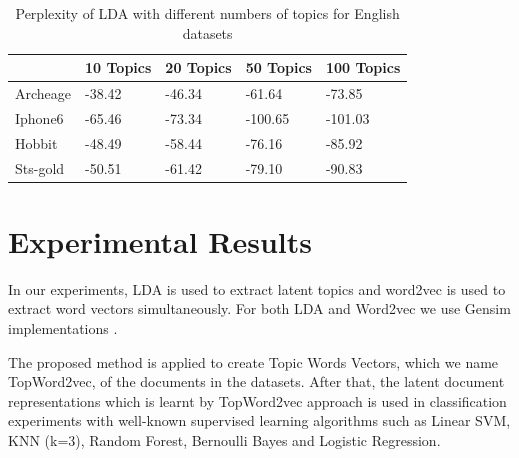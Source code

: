 \documentclass[a4paper,fleqn]{cas-dc}
\begin{document}
\begin{table}[width=.9\linewidth,cols=4,pos=h]
	\caption{Perplexity of LDA with different numbers of topics for English datasets}	\label{tab4}
	\begin{tabular*}{\tblwidth}{@{} LLLLL@{} }
		\toprule
	 	\textbf{}   & \textbf{10 Topics} & \textbf{20 Topics} & \textbf{50 Topics} & \textbf{100 Topics} \\ 
		\midrule
		Archeage & -38.42             & -46.34             & -61.64             & -73.85              \\ 
		Iphone6  & -65.46             & -73.34             & -100.65            & -101.03             \\ 
		Hobbit   & -48.49             & -58.44             & -76.16             & -85.92              \\ 
		Sts-gold & -50.51             & -61.42             & -79.10             & -90.83              \\  
		\bottomrule
	\end{tabular*}
\end{table}



\section{Experimental Results}

In our experiments, LDA is used to extract latent topics and word2vec is used to extract word vectors simultaneously. For both LDA and Word2vec we use Gensim implementations \citep{ref20}. 

The proposed method is applied to create Topic Words Vectors, which we name TopWord2vec, of the documents in the datasets. After that, the latent document representations which is learnt by TopWord2vec approach is used in classification experiments with well-known supervised learning algorithms such as Linear SVM, KNN (k=3), Random Forest, Bernoulli Bayes and Logistic Regression.
\end{document}
